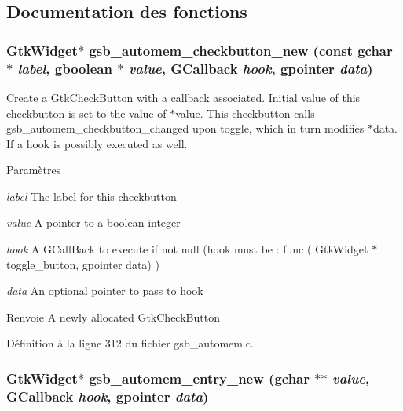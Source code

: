 \subsection{Documentation des fonctions}
\subsubsection[{gsb\_\-automem\_\-checkbutton\_\-new}]{\setlength{\rightskip}{0pt plus 5cm}GtkWidget$\ast$ gsb\_\-automem\_\-checkbutton\_\-new (const gchar $\ast$ {\em label}, \/  gboolean $\ast$ {\em value}, \/  GCallback {\em hook}, \/  gpointer {\em data})}\label{gsb__automem_8h_ad32c3b7a4ae54cbe312fe4e1ee22e10f}
Create a GtkCheckButton with a callback associated. Initial value of this checkbutton is set to the value of $\ast$value. This checkbutton calls gsb\_\-automem\_\-checkbutton\_\-changed upon toggle, which in turn modifies $\ast$data. If a hook is possibly executed as well.


\begin{DoxyParams}{Paramètres}
\item[{\em label}]The label for this checkbutton \item[{\em value}]A pointer to a boolean integer \item[{\em hook}]A GCallBack to execute if not null (hook must be : func ( GtkWidget $\ast$toggle\_\-button, gpointer data) ) \item[{\em data}]An optional pointer to pass to hook\end{DoxyParams}
\begin{DoxyReturn}{Renvoie}
A newly allocated GtkCheckButton 
\end{DoxyReturn}


Définition à la ligne 312 du fichier gsb\_\-automem.c.

\subsubsection[{gsb\_\-automem\_\-entry\_\-new}]{\setlength{\rightskip}{0pt plus 5cm}GtkWidget$\ast$ gsb\_\-automem\_\-entry\_\-new (gchar $\ast$$\ast$ {\em value}, \/  GCallback {\em hook}, \/  gpointer {\em data})}\label{gsb__automem_8h_afe5c31e5709a71264b93ee912fed12f4}


